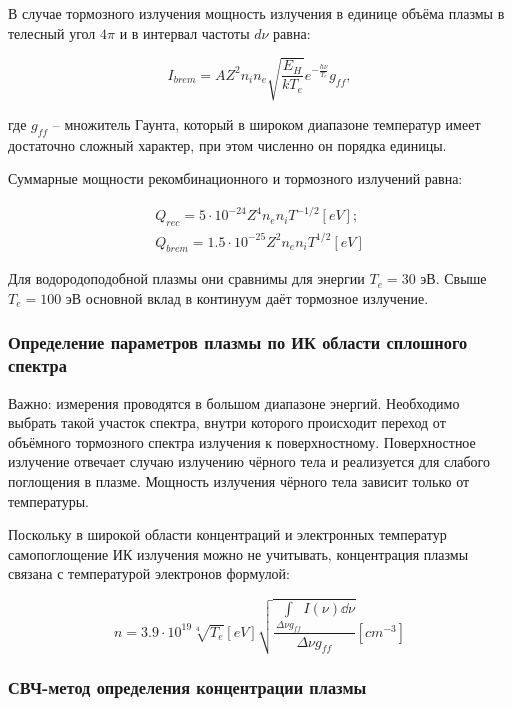 \documentclass[10pt, a4paper]{article}
\begin{document}
В случае тормозного излучения мощность излучения в единице объёма плазмы в телесный угол $4 \pi$ и в интервал частоты $d\nu$ равна:

\begin{equation}
	I_{brem} = A Z^2n_in_e\sqrt{\frac{E_H}{kT_e}}e^{-\frac{h \nu}{T_e}}g_{ff},
\end{equation}

где $g_{ff}$ -- множитель Гаунта, который в широком диапазоне температур имеет достаточно сложный характер, при этом численно он порядка единицы.

Суммарные мощности рекомбинационного и тормозного излучений равна:

\begin{align*}
	Q_{rec} = 5\cdot10^{-24}Z^4n_en_iT^{-1/2}[eV]; \\
	Q_{brem} = 1.5\cdot10^{-25}Z^2n_en_iT^{1/2}[eV]	
\end{align*}

Для водородоподобной плазмы они сравнимы для энергии $T_e = 30$ эВ. Свыше $T_e = 100$ эВ основной вклад в континуум даёт тормозное излучение.

\subsubsection{Определение параметров плазмы по ИК области сплошного спектра}

Важно: измерения проводятся в большом диапазоне энергий.
Необходимо выбрать такой участок спектра, внутри которого происходит переход от объёмного тормозного спектра излучения к поверхностному. Поверхностное излучение отвечает случаю излучению чёрного тела и реализуется для слабого поглощения в плазме. Мощность излучения чёрного тела зависит только от температуры.

Поскольку в широкой области концентраций и электронных температур самопоглощение ИК излучения можно не учитывать, концентрация плазмы связана с температурой электронов формулой:

\begin{equation*}
	n=3.9\cdot10^19 \sqrt[4]{T_e} [eV] \sqrt{\frac{\int\limits_{\Delta\nu g_{ff}} I(\nu)\dd{\nu}}{\Delta\nu g_{ff}}} \left[cm^{-3}\right] 
\end{equation*}

\subsubsection{СВЧ-метод определения концентрации плазмы}
\end{document}

